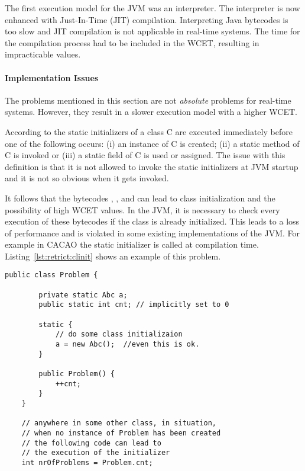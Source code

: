 The first execution model for the JVM was an interpreter. The
interpreter is now enhanced with Just-In-Time (JIT) compilation.
Interpreting Java bytecodes is too slow and JIT compilation is not
applicable in real-time systems. The time for the compilation
process had to be included in the WCET, resulting in impracticable
values.

\paragraph{Implementation Issues}
\label{para:restrict:clinit}

The problems mentioned in this section are not \emph{absolute}
problems for real-time systems. However, they result in a slower
execution model with a higher WCET.

According to \cite{jvm} the static initializers of a class C are
executed immediately before one of the following occurs: (i) an
instance of C is created; (ii) a static method of C is invoked or
(iii) a static field of C is used or assigned. The issue with this
definition is that it is not allowed to invoke the static
initializers at JVM startup and it is not so obvious when it gets
invoked.

It follows that the bytecodes , ,
 and  can lead to class initialization
and the possibility of high WCET values. In the JVM, it is necessary
to check every execution of these bytecodes if the class is already
initialized. This leads to a loss of performance and is violated in
some existing implementations of the JVM. For example in CACAO
\cite{cacao} the static initializer is called at compilation time.
Listing~\ref{lst:retrict:clinit} shows an example of this problem.

\begin{lstlisting}[float,caption={Class initialization can occur very late},
label=lst:retrict:clinit]
    public class Problem {

        private static Abc a;
        public static int cnt; // implicitly set to 0

        static {
            // do some class initializaion
            a = new Abc();  //even this is ok.
        }

        public Problem() {
            ++cnt;
        }
    }

    // anywhere in some other class, in situation,
    // when no instance of Problem has been created
    // the following code can lead to
    // the execution of the initializer
    int nrOfProblems = Problem.cnt;

\end{lstlisting}

